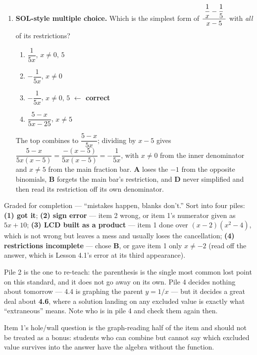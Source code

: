 \documentclass[10pt]{article}
\newcommand{\TallMath}[1]{$\displaystyle #1\rule[-1.4em]{0pt}{3.2em}$}
\begin{document}
\begin{enumerate}[leftmargin=1.8em, itemsep=9pt]
  \item \textbf{SOL-style multiple choice.} Which is the simplest form of
        \; \TallMath{\frac{\;\dfrac{1}{x}-\dfrac{1}{5}\;}{\;x-5\;}} \; with \emph{all} of its
        restrictions?
        \begin{enumerate}[label=\Alph*., leftmargin=1.9em, itemsep=1pt]
          \item $\dfrac{1}{5x}$, \; $x\neq0,\,5$
          \item $-\dfrac{1}{5x}$, \; $x\neq0$
          \item $-\dfrac{1}{5x}$, \; $x\neq0,\,5$
                \quad \textcolor{keyred}{\textbf{$\leftarrow$ correct}}
          \item $\dfrac{5-x}{5x-25}$, \; $x\neq5$
        \end{enumerate}
        \vspace{2pt}
        {\small The top combines to $\dfrac{5-x}{5x}$; dividing by $x-5$ gives
        $\dfrac{5-x}{5x(x-5)}=\dfrac{-(x-5)}{5x(x-5)}=-\dfrac{1}{5x}$, with $x\neq0$ from the inner
        denominator and $x\neq5$ from the main fraction bar. \textbf{A} loses the $-1$ from the
        opposite binomials, \textbf{B} forgets the main bar's restriction, and \textbf{D} never
        simplified and then read its restriction off its own denominator.}
\end{enumerate}

\begin{teachernote}
Graded for completion --- ``mistakes happen, blanks don't.'' Sort into four piles: \textbf{(1) got it};
\textbf{(2) sign error} --- item 2 wrong, or item 1's numerator given as $5x+10$; \textbf{(3) LCD built
as a product} --- item 1 done over $(x-2)(x^2-4)$, which is not wrong but leaves a mess and usually
loses the cancellation; \textbf{(4) restrictions incomplete} --- chose \textbf{B}, or gave item 1 only
$x\neq-2$ (read off the answer, which is Lesson 4.1's error at its third appearance).

\vspace{3pt}
Pile 2 is the one to re-teach: the parenthesis is the single most common lost point on this standard,
and it does not go away on its own. Pile 4 decides nothing about tomorrow --- 4.4 is graphing the parent
$y=1/x$ --- but it decides a great deal about \textbf{4.6}, where a solution landing on any excluded
value is exactly what ``extraneous'' means. Note who is in pile 4 and check them again then.

\vspace{3pt}
Item 1's hole/wall question is the graph-reading half of the item and should not be treated as a bonus:
students who can combine but cannot say which excluded value survives into the answer have the algebra
without the function.
\end{teachernote}
\end{document}
